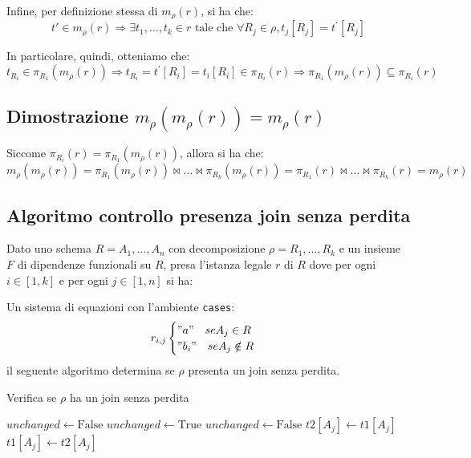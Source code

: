 \documentclass{article}
\begin{document}
Infine, per definizione stessa di $m_{\rho}(r)$, si ha che:
\[ t' \in m_{\rho}(r) \Rightarrow \exists t_1, \ldots, t_k \in r \text{ tale che } \forall R_j \in \rho, t_j[R_j] = t^{'}[R_j] \]

In particolare, quindi, otteniamo che:
\[ t_{R_i} \in \pi_{R_1}(m_{\rho}(r)) \Rightarrow t_{R_i} = t^{'}[R_i] = t_i[R_i] \in \pi_{R_i}(r) \Rightarrow \pi_{R_1}(m_{\rho}(r)) \subseteq \pi_{R_i}(r) \]

\subsection{Dimostrazione $m_{\rho}(m_{\rho}(r)) = m_{\rho}(r)$}
Siccome $\pi_{R_i}(r) = \pi_{R_1}(m_{\rho}(r))$, allora si ha che:
\[ m_{\rho}(m_{\rho}(r)) = \pi_{R_1}(m_{\rho}(r)) \bowtie \ldots \bowtie \pi_{R_k}(m_{\rho}(r)) = \pi_{R_1}(r) \bowtie \ldots \bowtie \pi_{R_k}(r) = m_{\rho}(r) \]

\pagebreak

\subsection{Algoritmo controllo presenza join senza perdita}
Dato uno schema $R = A_1, \ldots, A_n$ con decomposizione $\rho = R_1, \ldots, R_k$ e un insieme $F$ di dipendenze funzionali su $R$, presa l'istanza legale $r$ di $R$ dove per ogni $i \in [1, k]$ e per ogni $j \in [1, n]$ si ha:


Un sistema di equazioni con l'ambiente \texttt{cases}:
\[r_{i, j}
\begin{cases}
    "a" \quad se A_j \in R \\
    "b_i" \quad se A_j \notin R
\end{cases}
\]
il seguente algoritmo determina se $\rho$ presenta un join senza perdita.
\begin{algorithm}
  \caption{Verifica se $\rho$ ha un join senza perdita}
  \begin{algorithmic}[1]
          \State $unchanged \gets \text{False}$
              \State $unchanged \gets \text{True}$
                              \State $unchanged \gets \text{False}$
                                      \State $t2[A_j] \gets t1[A_j]$
                                  \Else
                                      \State $t1[A_j] \gets t2[A_j]$
                                  \EndIf
                              \EndFor
                          \EndIf
                      \EndFor
                  \EndFor
              \EndFor
          \EndWhile
                  \State \Return {}
              \EndIf
          \EndFor
          \State \Return {}
      \EndFunction
  \end{algorithmic}
\end{algorithm}
\pagebreak
\end{document}

